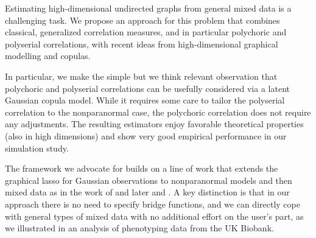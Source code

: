 

Estimating high-dimensional undirected graphs from general mixed data is a challenging task.
We propose an approach for this problem that combines classical, generalized correlation measures, and in particular polychoric and polyserial correlations, with recent ideas from high-dimensional graphical modelling and copulas. 

In particular, we make the simple but we think relevant observation that polychoric and polyserial correlations   
can be usefully considered via a latent Gaussian copula model. While it requires some care to tailor the polyserial correlation to the nonparanormal case, the polychoric correlation does not require any adjustments.   The resulting estimators enjoy favorable theoretical properties (also in high dimensions) and show very good empirical performance in our simulation study. 

The framework we advocate for builds on a line of work that extends the graphical lasso for Gaussian observations to nonparanormal models and then mixed data as in the work of \citet{Fan17} and later \cite{Quan18} and \citet{Feng19}. A key distinction is that in our approach there is no need to specify bridge functions, and we can directly cope with general types of mixed data with no additional effort on the user's part, as we illustrated in an analysis of phenotyping data from the UK Biobank.








